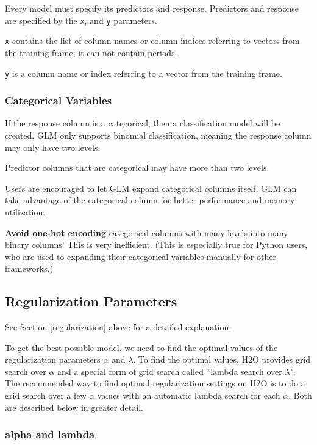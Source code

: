 Every model must specify its predictors and response.  Predictors and response are specified by the \texttt{x},
and \texttt{y} parameters.

\texttt{x} contains the list of column names or column indices referring to vectors from the training frame; it can
not contain periods.

\texttt{y} is a column name or index referring to a vector from the training frame.

\subsubsection{Categorical Variables}

If the response column is a categorical, then a classification model will be created.  GLM only supports binomial
classification, meaning the response column may only have two levels.

Predictor columns that are categorical may have more than two levels.

Users are encouraged to let GLM expand categorical columns itself.  GLM can take advantage of the categorical
column for better performance and memory utilization.

\textbf{Avoid one-hot encoding} categorical columns with many levels into many binary columns!  This is very
inefficient.  (This is especially true for Python users, who are used to expanding their categorical variables
manually for other frameworks.)

\subsection{Regularization Parameters}

See Section \ref{regularization} above for a detailed explanation.

To get the best possible model, we need to find the optimal values of the regularization parameters $\alpha$ and
$\lambda$.  To find the optimal values, H2O provides grid search over $\alpha$ and a special form of grid search
called ``lambda search over $\lambda$". The recommended way to find optimal regularization settings on H2O is to do
a grid search over a few $\alpha$ values with an automatic lambda search for each $\alpha$. Both are described
below in greater detail.

\subsubsection{alpha and lambda}

